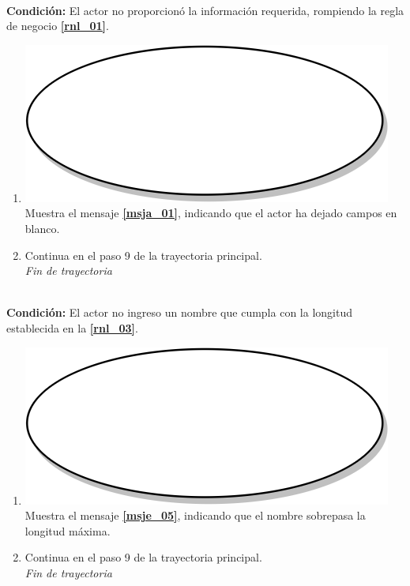 \textbf{} \\
\textbf{Condición:} El actor no proporcionó la información requerida, rompiendo la regla de negocio \textbf{\ref{rnl_01}}.\\
 \begin{enumerate}[label=A\arabic*]
    \item {\includegraphics[scale=.05]{Capitulo3/img/proceso.png} Muestra el mensaje \textbf{\ref{msja_01}}, indicando que el actor ha dejado campos en blanco.}
    \item {Continua en el paso 9  de la trayectoria principal.} \\
    \textit{Fin de trayectoria} \\
\end{enumerate}

\textbf{} \\
\textbf{Condición:} El actor no ingreso un nombre que cumpla con la longitud establecida en la \textbf{\ref{rnl_03}}.\\
 \begin{enumerate}[label=B\arabic*]
    \item {\includegraphics[scale=.05]{Capitulo3/img/proceso.png} Muestra el mensaje \textbf{\ref{msje_05}}, indicando que el nombre sobrepasa la longitud máxima.}
    \item {Continua en el paso 9 de la trayectoria principal.} \\
    \textit{Fin de trayectoria} \\
\end{enumerate}

